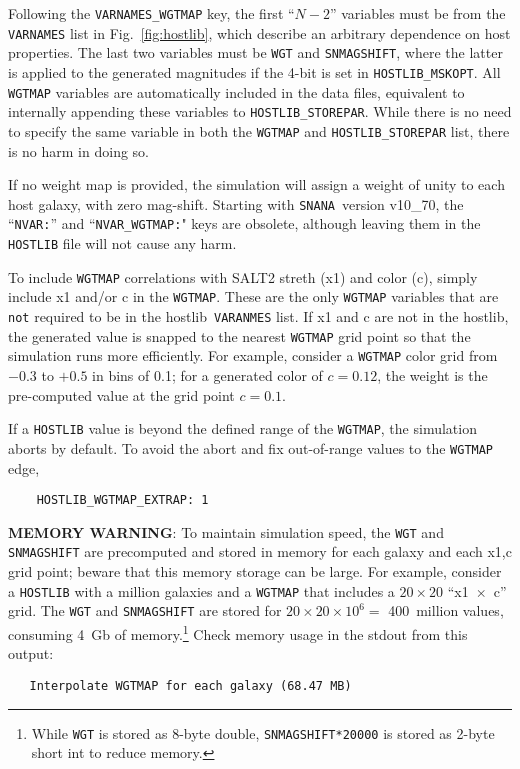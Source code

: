 \documentclass[12pt]{article}
\newcommand{\snana}{{\tt SNANA}}
\newcommand{\hostlib}{{\sc hostlib}}
\begin{document}
{Following the {\tt VARNAMES\_WGTMAP} key, the first ``$N-2$'' 
variables must be from the {\tt VARNAMES} list in Fig.~\ref{fig:hostlib},
which describe an arbitrary dependence on host properties.
The last two variables must be {\tt WGT} and {\tt SNMAGSHIFT},
where the latter is applied to the generated magnitudes if the
4-bit is set in {\tt HOSTLIB\_MSKOPT}.
All {\tt WGTMAP} variables are automatically included in the
data files, equivalent to internally appending these variables to 
{\tt HOSTLIB\_STOREPAR}. While there is no need to specify the
same variable in both the {\tt WGTMAP} and {\tt HOSTLIB\_STOREPAR} list,
there is no harm in doing so.

If no weight map is provided, the simulation will assign
a weight of unity to each host galaxy, with zero mag-shift.
Starting with \snana\ version v10\_70, the ``{\tt NVAR:}''
and ``{\tt NVAR\_WGTMAP:}" keys are obsolete, although leaving
them in the {\tt HOSTLIB} file will not cause any harm.

To include {\tt WGTMAP} correlations with SALT2 streth (x1) and color (c),
simply include x1 and/or c in the {\tt WGTMAP}. These are the only
{\tt WGTMAP} variables that are {\tt not} required to be in the
\hostlib\ {\tt VARANMES} list. If x1 and c are not in the \hostlib,
the generated value is snapped to the nearest {\tt WGTMAP} grid point
so that the simulation runs more efficiently. For example,
consider a {\tt WGTMAP} color grid from $-0.3$ to $+0.5$ in bins of 0.1;
for a generated color of $c=0.12$, the weight is the pre-computed value
at the grid point $c=0.1$. 

If a {\tt HOSTLIB} value is beyond the defined range of the {\tt WGTMAP},
the simulation aborts by default. To avoid the abort and fix out-of-range
values to the {\tt WGTMAP} edge, 
\begin{verbatim}
    HOSTLIB_WGTMAP_EXTRAP: 1
\end{verbatim}


{\bf MEMORY WARNING}: 
To maintain simulation speed, the {\tt WGT} and {\tt SNMAGSHIFT} are 
precomputed and stored in memory for each galaxy and each x1,c grid point;
beware that this memory storage can be large.
For example, consider a {\tt HOSTLIB} with a million galaxies and
a {\tt WGTMAP} that includes a $20\times 20$ ``x1~$\times$~c'' grid. 
The {\tt WGT} and {\tt SNMAGSHIFT} are stored for $20\times 20\times 10^6 = $
400~million values, consuming 4~Gb of memory.\footnote{While {\tt WGT}
  is stored as 8-byte double, {\tt SNMAGSHIFT*20000} is stored as
  2-byte short int to reduce memory.}
%
Check memory usage in the stdout from this output:
\begin{verbatim}
   Interpolate WGTMAP for each galaxy (68.47 MB)
\end{verbatim}


}
\end{document}
